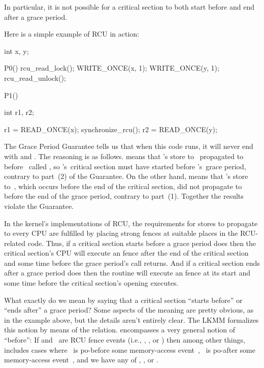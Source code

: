 In particular, it is not possible for a critical section to both start
before and end after a grace period.

Here is a simple example of RCU in action:

\begin{VerbatimU}
	int x, y;

	P0()
	{
		rcu_read_lock();
		WRITE_ONCE(x, 1);
		WRITE_ONCE(y, 1);
		rcu_read_unlock();
	}

	P1()
	{
		int r1, r2;

		r1 = READ_ONCE(x);
		synchronize_rcu();
		r2 = READ_ONCE(y);
	}
\end{VerbatimU}

The Grace Period Guarantee tells us that when this code runs, it will
never end with  and .
The reasoning is as follows.
 means that 's store to~ propagated to~
before ~called , so 's~critical
section must have started before 's~grace period, contrary to
part~(2) of the Guarantee.
On the other hand,  means that 's store to~,
which occurs before the end of the critical section, did not propagate
to~ before the end of the grace period, contrary to part~(1).
Together the results violate the Guarantee.

In the kernel's implementations of RCU, the requirements for stores
to propagate to every CPU are fulfilled by placing strong fences at
suitable places in the RCU-related code.
Thus, if a critical section starts before a grace period does then
the critical section's CPU will execute an  fence after
the end of the critical section and some time before the grace
period's  call returns.
And if a critical section ends after a grace period does then the
 routine will execute an  fence
at its start and some time before the critical section's opening
 executes.

What exactly do we mean by saying that a critical section ``starts
before'' or ``ends after'' a grace period?
Some aspects of the meaning are pretty obvious, as in the example
above, but the details aren't entirely clear.
The LKMM formalizes this notion by means of the  relation.
 encompasses a very general notion of ``before'':
If  and~ are RCU fence events (i.e., ,
, or ) then among other things,
 includes cases where ~is po-before some
memory-access event~, ~is po-after some memory-access
event~, and we have any of , ,
or .

